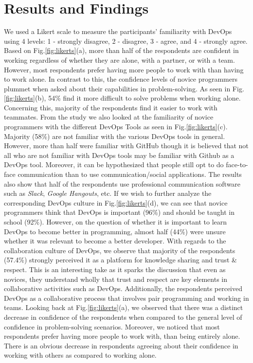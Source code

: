 \documentclass{sigchi}
\begin{document}
\section{Results and Findings}
We used a Likert scale to measure the participants' familiarity with DevOps using 4 levels: 1 - strongly disagree, 2 - disagree, 3 - agree, and 4 - strongly agree. Based on Fig.\ref{fig:likerts}(a), more than half of the respondents are confident in working regardless of whether they are alone, with a partner, or with a team. However, most respondents prefer having more people to work with than having to work alone.  In contrast to this, the confidence levels of novice programmers plummet when asked about their capabilities in problem-solving. As seen in Fig.\ref{fig:likerts}(b), 54\% find it more difficult to solve problems when working alone. Concerning this, majority of the respondents find it easier to work with teammates. From the study we also looked at the familiarity of novice programmers with the different DevOps Tools as seen in Fig.\ref{fig:likerts}(c). Majority (58\%) are not familiar with the various DevOps tools in general. However, more than half were familiar with GitHub though it is believed that not all who are not familiar with DevOps tools may be familiar with Github as a DevOps tool. Moreover, it can be hypothesized that people still opt to do face-to-face communication than to use communication/social applications. The results also show that half of the respondents use professional communication software such as \textit{Slack}, \textit{Google Hangouts}, etc. If we wish to further analyze the corresponding DevOps culture in Fig.\ref{fig:likerts}(d), we can see that novice programmers think that DevOps is important (96\%) and should be taught in school (92\%). However, on the question of whether it is important to learn DevOps to become better in programming, almost half (44\%) were unsure whether it was relevant to become a better developer. With regards to the collaboration culture of DevOps, we observe that majority of the respondents (57.4\%) strongly perceived it as a platform for knowledge sharing and trust \& respect. This is an interesting take as it sparks the discussion that even as novices, they understand wholly that trust and respect are key elements in collaborative activities such as DevOps. Additionally, the respondents perceived DevOps as a collaborative process that involves pair programming and working in teams. Looking back at Fig.\ref{fig:likerts}(a), we observed that there was a distinct decrease in confidence of the respondents when compared to the general level of confidence in problem-solving scenarios. Moreover, we noticed that most respondents prefer having more people to work with, than being entirely alone. There is an obvious decrease in respondents agreeing about their confidence in working with others as compared to working alone.
\end{document}
